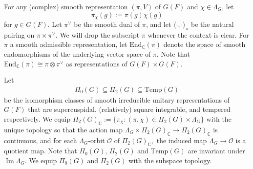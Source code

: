 \documentclass[10pt]{amsart}
\theoremstyle{definition}
\numberwithin{equation}{section}
\numberwithin{equation}{subsection}
\newcommand{\CC}{\mathbb{C}}
\newcommand{\Temp}{\mathrm{Temp}}
\renewcommand{\Im}{\mathop{\mathrm{Im}}}
\begin{document}
For any (complex) smooth representation $(\pi,V)$ of $G(F)$ and $\chi\in\Lambda_G$, let $$\pi_\chi(g) := \pi(g)\chi(g)$$ for $g\in G(F)$. Let $\pi^\lor$ be the smooth dual of $\pi$, and let $\langle \cdot ,\cdot \rangle_\pi$ be the natural pairing on $\pi\times \pi^\lor.$ We will drop the subscript $\pi$ whenever the context is clear. For $\pi$ a smooth admissible representation, let $\mathrm{End}_\CC(\pi)$ denote the space of smooth endomorphisms of the underlying vector space of $\pi$. Note that $\mathrm{End}_\CC(\pi)\cong \pi\otimes \pi^\vee$ as representations of $G(F)\times G(F)$.

Let
\begin{align*}
    \Pi_0(G)\subseteq \Pi_2(G)\subseteq \Temp(G)
\end{align*}
be the isomorphism classes of smooth irreducible unitary representations of $G(F)$ that are supercuspidal, (relatively) square integrable, and tempered respectively.  We equip $\Pi_2(G)_\CC := \{\pi_\chi: (\pi,\chi)\in\Pi_2(G)\times \Lambda_G\}$ with the unique topology so that the action map $\Lambda_G\times \Pi_2(G)_\CC\to \Pi_2(G)_\CC$ is continuous, and for each $\Lambda_G$-orbit $\mathcal{O}$ of  $\Pi_2(G)_\CC,$ the induced map $\Lambda_G\longrightarrow\mathcal{O}$ is a quotient map. Note that $\Pi_0(G)$, $\Pi_2(G)$ and $\Temp(G)$ are invariant under $\Im\Lambda_G$. We equip $\Pi_0(G)$ and $\Pi_2(G)$ with the subspace topology.
\end{document}
